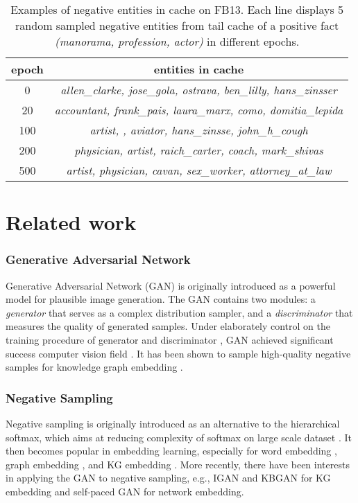 \documentclass[conference]{IEEEtran}
\begin{document}
\begin{table}[ht]
\centering
	\caption{Examples of negative entities in cache on FB13. Each line displays 5 random sampled negative entities from tail cache of a positive fact \textit{(manorama, profession, actor)} in different epochs.}
	\label{tab:cache:example}
\begin{tabular}{c|c}
		\hline 
		epoch & entities in cache \\ \hline
		0 & \textit{allen\_clarke,  jose\_gola, ostrava, ben\_lilly, hans\_zinsser} \\ \hline
		20 & \textit{accountant, frank\_pais, laura\_marx, como, domitia\_lepida}   \\ \hline
		100 & \textit{artist, , aviator, hans\_zinsse, john\_h\_cough}    \\ \hline
		200 & \textit{physician, artist, raich\_carter, coach, mark\_shivas}      \\ \hline
		500 & \textit{artist, physician, cavan, sex\_worker, attorney\_at\_law} \\ \hline
	\end{tabular}
\end{table}


\section{Related work}
\label{sec:rel-work}
\subsubsection{Generative Adversarial Network} 
Generative Adversarial Network (GAN) is originally introduced as a powerful model for plausible image generation. 
The GAN contains two modules: 
a \emph{generator} that serves as a complex distribution sampler, 
and a \emph{discriminator} that measures the quality of generated samples. 
Under elaborately control on the training procedure of generator and discriminator \cite{arjovsky2017wasserstein,gulrajani2017improved}, 
GAN achieved significant success computer vision field \cite{zhang2018self,zhu2017unpaired}. 
It has been shown to sample high-quality negative samples for knowledge graph embedding \cite{cai2018kbgan,wang2018incorporating}.

\subsubsection{Negative Sampling} 
Negative sampling is originally introduced as an alternative to the hierarchical softmax, 
which aims at reducing complexity of softmax on large scale dataset \cite{gutmann2010noise}. 
It then becomes popular in embedding learning, especially for 
word embedding \cite{goldberg2014word2vec}, graph embedding \cite{grover2016node2vec}, 
and KG embedding \cite{wang2017knowledge}.
More 
recently, there have been interests in applying the GAN to negative sampling,
e.g., IGAN \cite{wang2018incorporating} and KBGAN \cite{cai2018kbgan} for KG embedding
and self-paced GAN \cite{gao2018self} for network embedding.
\end{document}
